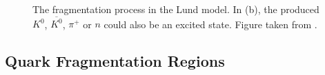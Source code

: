 \begin{figure}[!h]
  \centering
	\caption{The fragmentation process in the Lund model. In (b), the produced $K^0$, $\overline{K^0}$, $\pi^+$ or $n$ could also be an excited state. Figure taken from \cite{Panknin}.}
	\label{pic:Lund}
\end{figure}

\subsection{Quark Fragmentation Regions}


